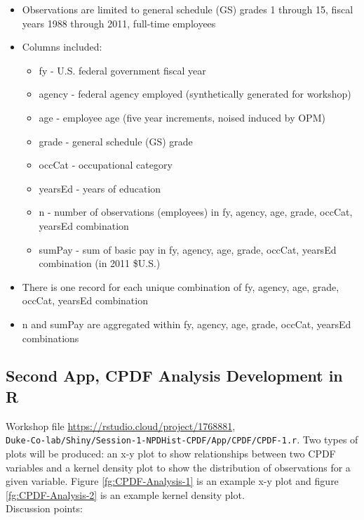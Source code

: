 \documentclass[10pt, letterpaper]{article}
\begin{document}
\begin{spacing}{1.0}
\begin{itemize}
    \item Observations are limited to general schedule (GS) grades 1 through 15, fiscal years 1988 through 2011, full-time employees
    \item Columns included:
    \begin{itemize}
        \item fy - U.S. federal government fiscal year
        \item agency - federal agency employed (synthetically generated for workshop)
        \item age - employee age (five year increments, noised induced by OPM)
        \item grade - general schedule (GS) grade
        \item occCat - occupational category 
        \item yearsEd - years of education
        \item n - number of observations (employees) in fy, agency, age, grade, occCat, yearsEd combination
        \item sumPay - sum of basic pay in fy, agency, age, grade, occCat, yearsEd combination (in 2011 \$U.S.)
    \end{itemize}
    \item There is one record for each unique combination of fy, agency, age, grade, occCat, yearsEd combination
    \item n and sumPay are aggregated within fy, agency, age, grade, occCat, yearsEd combinations
\end{itemize}


\subsection{Second App, CPDF Analysis Development in R}\label{sec:CPDF-R}

Workshop file \url{https://rstudio.cloud/project/1768881},\\ \texttt{Duke-Co-lab/Shiny/Session-1-NPDHist-CPDF/App/CPDF/CPDF-1.r}.  Two types of plots will be produced:  an x-y plot to show relationships between two CPDF variables and a kernel density plot to show the distribution of observations for a given variable.  Figure \ref{fg:CPDF-Analysis-1} is an example x-y plot and figure \ref{fg:CPDF-Analysis-2} is an example kernel density plot.\\

Discussion points:


\end{spacing}
\end{document}
